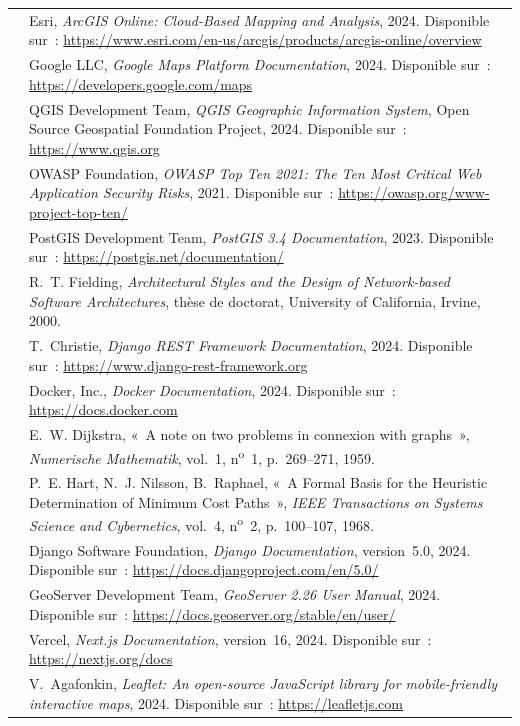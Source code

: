 \documentclass[12pt, a4paper]{report}
\begin{document}
\begin{longtable}{%
  >{\bfseries\color{eccdarkgreen}\centering\arraybackslash}p{1.6cm}
  >{\raggedright\arraybackslash}p{11.4cm}}
[8] & Esri, \textit{ArcGIS Online: Cloud-Based Mapping and Analysis}, 2024. Disponible sur~: \url{https://www.esri.com/en-us/arcgis/products/arcgis-online/overview} \\
[9] & Google LLC, \textit{Google Maps Platform Documentation}, 2024. Disponible sur~: \url{https://developers.google.com/maps} \\
[10] & QGIS Development Team, \textit{QGIS Geographic Information System}, Open Source Geospatial Foundation Project, 2024. Disponible sur~: \url{https://www.qgis.org} \\
[11] & OWASP Foundation, \textit{OWASP Top Ten 2021: The Ten Most Critical Web Application Security Risks}, 2021. Disponible sur~: \url{https://owasp.org/www-project-top-ten/} \\
[12] & PostGIS Development Team, \textit{PostGIS 3.4 Documentation}, 2023. Disponible sur~: \url{https://postgis.net/documentation/} \\
[13] & R.~T. Fielding, \textit{Architectural Styles and the Design of Network-based Software Architectures}, thèse de doctorat, University of California, Irvine, 2000. \\
[14] & T.~Christie, \textit{Django REST Framework Documentation}, 2024. Disponible sur~: \url{https://www.django-rest-framework.org} \\
[15] & Docker, Inc., \textit{Docker Documentation}, 2024. Disponible sur~: \url{https://docs.docker.com} \\
[16] & E.~W. Dijkstra, «~A note on two problems in connexion with graphs~», \textit{Numerische Mathematik}, vol.~1, n\textsuperscript{o}~1, p.~269--271, 1959. \\
[17] & P.~E. Hart, N.~J. Nilsson, B.~Raphael, «~A Formal Basis for the Heuristic Determination of Minimum Cost Paths~», \textit{IEEE Transactions on Systems Science and Cybernetics}, vol.~4, n\textsuperscript{o}~2, p.~100--107, 1968. \\
[18] & Django Software Foundation, \textit{Django Documentation}, version~5.0, 2024. Disponible sur~: \url{https://docs.djangoproject.com/en/5.0/} \\
[19] & GeoServer Development Team, \textit{GeoServer 2.26 User Manual}, 2024. Disponible sur~: \url{https://docs.geoserver.org/stable/en/user/} \\
[20] & Vercel, \textit{Next.js Documentation}, version~16, 2024. Disponible sur~: \url{https://nextjs.org/docs} \\
[21] & V.~Agafonkin, \textit{Leaflet: An open-source JavaScript library for mobile-friendly interactive maps}, 2024. Disponible sur~: \url{https://leafletjs.com} \\

\end{longtable}
\end{document}
